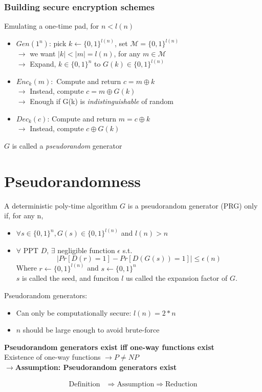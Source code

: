 \documentclass[12pt]{article}
\begin{document}
\subsubsection{Building secure encryption schemes}
Emulating a one-time pad, for $n < l(n)$
\begin{itemize}
\item $Gen(1^n)$: pick $k\leftarrow \{0,1\}^{l(n)}$, set $\mathcal{M} = \{0,1\}^{l(n)}$\\
$\rightarrow$ we want $ |k| < |m| = l(n)$, for any $m \in \mathcal{M}$\\
$\rightarrow $ Expand, $k \in \{0,1\}^n$ to $G(k) \in \{0,1\}^{l(n)}$
\item $Enc_k(m):$ Compute and return $c=m \oplus k$\\
$\rightarrow$ Instead, compute $c=m\oplus G(k)$\\
$\rightarrow$ Enough if G(k) is \emph{indistinguishable} of random
\item $Dec_k(c)$: Compute and return $m=c\oplus k$\\
$\rightarrow$ Instead, compute $c\oplus G(k)$
\end{itemize}
$G$ is called a \emph{pseudorandom} generator
\section{Pseudorandomness}
A deterministic poly-time algorithm $G$ is a pseudorandom generator (PRG) only if, for any n,\\
\begin{itemize}
\item $\forall s \in \{0,1\}^n, G(s) \in \{0,1\}^{l(n)}$ and $l(n) > n$
\item $\forall$ PPT $D$, $\exists$ negligible function $\epsilon$ s.t.
\begin{equation}
|Pr[D(r)=1]-Pr[D(G(s))=1]| \le \epsilon(n)
\end{equation}
Where $r\leftarrow \{0,1\}^{l(n)}$ and $s\leftarrow \{0,1\}^n$\\
$s$ is called the seed, and funciton $l$ us called the expansion factor of $G$.
\end{itemize}

Pseudorandom generators:
\begin{itemize}
\item Can only be computationally secure: $l(n) = 2*n$
\item $n$ should be large enough to avoid brute-force
\end{itemize}
\textbf{Pseudorandom generators exist iff one-way functions exist} \\
Existence of one-way functions $\rightarrow P \neq NP$\\
$\rightarrow$\textbf{Assumption: Pseudorandom generators exist}
\begin{center}
\begin{align*}
\text{Definition} & \Rightarrow \text{Assumption} \Rightarrow \text{Reduction}
\end{align*}
\end{center}
\end{document}
